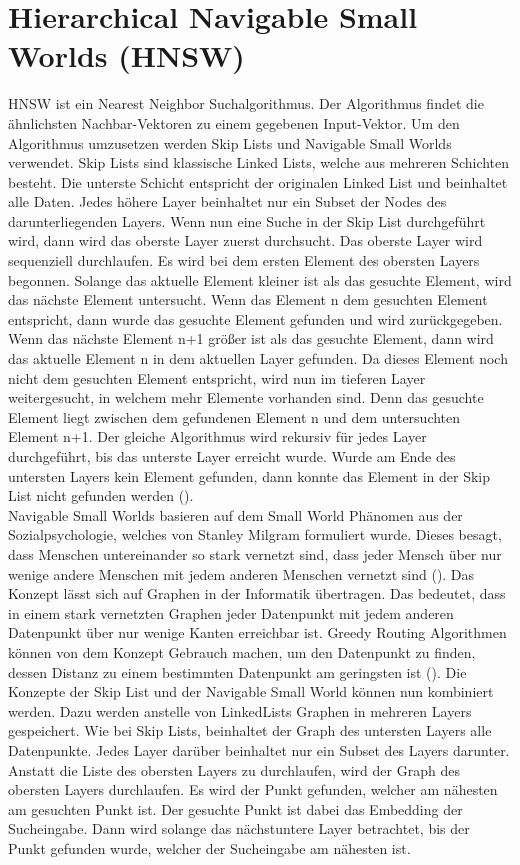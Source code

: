 \section{Hierarchical Navigable Small Worlds (HNSW)}
HNSW ist ein Nearest Neighbor Suchalgorithmus.
Der Algorithmus findet die ähnlichsten Nachbar-Vektoren zu einem gegebenen Input-Vektor.
Um den Algorithmus umzusetzen werden Skip Lists und Navigable Small Worlds verwendet.
Skip Lists sind klassische Linked Lists, welche aus mehreren Schichten besteht.
Die unterste Schicht entspricht der originalen Linked List und beinhaltet alle Daten.
Jedes höhere Layer beinhaltet nur ein Subset der Nodes des darunterliegenden Layers.
Wenn nun eine Suche in der Skip List durchgeführt wird, dann wird das oberste Layer zuerst durchsucht.
Das oberste Layer wird sequenziell durchlaufen.
Es wird bei dem ersten Element des obersten Layers begonnen.
Solange das aktuelle Element kleiner ist als das gesuchte Element, wird das nächste Element untersucht.
Wenn das Element n dem gesuchten Element entspricht, dann wurde das gesuchte Element gefunden und wird zurückgegeben.
Wenn das nächste Element n+1 größer ist als das gesuchte Element, dann wird das aktuelle Element n in dem aktuellen Layer gefunden.
Da dieses Element noch nicht dem gesuchten Element entspricht, wird nun im tieferen Layer weitergesucht, in welchem mehr Elemente vorhanden sind.
Denn das gesuchte Element liegt zwischen dem gefundenen Element n und dem untersuchten Element n+1.
Der gleiche Algorithmus wird rekursiv für jedes Layer durchgeführt, bis das unterste Layer erreicht wurde.
Wurde am Ende des untersten Layers kein Element gefunden, dann konnte das Element in der Skip List nicht gefunden werden (\cite{10.5555/93711}).\\

Navigable Small Worlds basieren auf dem Small World Phänomen aus der Sozialpsychologie, welches von Stanley Milgram formuliert wurde.
Dieses besagt, dass Menschen untereinander so stark vernetzt sind, dass jeder Mensch über nur wenige andere Menschen mit jedem anderen Menschen vernetzt sind (\cite{Milgram_1967}).
Das Konzept lässt sich auf Graphen in der Informatik übertragen.
Das bedeutet, dass in einem stark vernetzten Graphen jeder Datenpunkt mit jedem anderen Datenpunkt über nur wenige Kanten erreichbar ist.
Greedy Routing Algorithmen können von dem Konzept Gebrauch machen, um den Datenpunkt zu finden, dessen Distanz zu einem bestimmten Datenpunkt am geringsten ist (\cite{Malkov_Yashunin_2020}).
Die Konzepte der Skip List und der Navigable Small World können nun kombiniert werden.
Dazu werden anstelle von LinkedLists Graphen in mehreren Layers gespeichert.
Wie bei Skip Lists, beinhaltet der Graph des untersten Layers alle Datenpunkte.
Jedes Layer darüber beinhaltet nur ein Subset des Layers darunter.
Anstatt die Liste des obersten Layers zu durchlaufen, wird der Graph des obersten Layers durchlaufen.
Es wird der Punkt gefunden, welcher am nähesten am gesuchten Punkt ist.
Der gesuchte Punkt ist dabei das Embedding der Sucheingabe.
Dann wird solange das nächstuntere Layer betrachtet, bis der Punkt gefunden wurde, welcher der Sucheingabe am nähesten ist.\\

